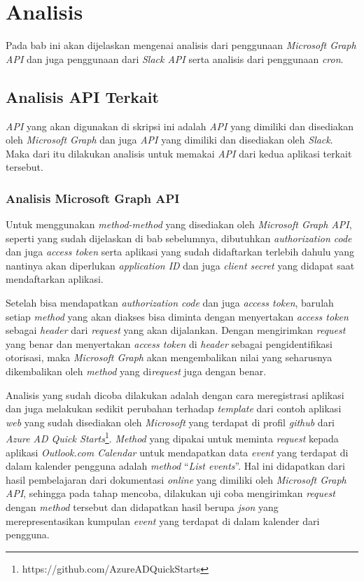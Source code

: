 \chapter{Analisis}
\label{chap:analisis}

Pada bab ini akan dijelaskan mengenai analisis dari penggunaan \textit{Microsoft Graph API} dan juga penggunaan dari \textit{Slack API} serta analisis dari penggunaan \textit{cron}. 

\section{Analisis API Terkait}
\label{sec:analisis_api_terkait}

\textit{API} yang akan digunakan di skripsi ini adalah \textit{API} yang dimiliki dan disediakan oleh \textit{Microsoft Graph} dan juga \textit{API} yang dimiliki dan disediakan oleh \textit{Slack}. Maka dari itu dilakukan analisis untuk memakai \textit{API} dari kedua aplikasi terkait tersebut. 

\subsection{Analisis Microsoft Graph API}
Untuk menggunakan \textit{method-method} yang disediakan oleh \textit{Microsoft Graph API}, seperti yang sudah dijelaskan di bab sebelumnya, dibutuhkan \textit{authorization code} dan juga \textit{access token} serta aplikasi yang sudah didaftarkan terlebih dahulu yang nantinya akan diperlukan \textit{application ID} dan juga \textit{client secret} yang didapat saat mendaftarkan aplikasi. 

Setelah bisa mendapatkan \textit{authorization code} dan juga \textit{access token}, barulah setiap \textit{method} yang akan diakses bisa diminta dengan menyertakan \textit{access token} sebagai \textit{header} dari \textit{request} yang akan dijalankan. Dengan mengirimkan \textit{request} yang benar dan menyertakan \textit{access token} di \textit{header} sebagai pengidentifikasi otorisasi, maka \textit{Microsoft Graph} akan mengembalikan nilai yang seharusnya dikembalikan oleh \textit{method} yang di\textit{request} juga dengan benar. 

Analisis yang sudah dicoba dilakukan adalah dengan cara meregistrasi aplikasi dan juga melakukan sedikit perubahan terhadap \textit{template} dari contoh aplikasi \textit{web} yang sudah disediakan oleh \textit{Microsoft} yang terdapat di profil \textit{github} dari \textit{Azure AD Quick Starts}\footnote{https://github.com/AzureADQuickStarts}. \textit{Method} yang dipakai untuk meminta \textit{request} kepada aplikasi \textit{Outlook.com Calendar} untuk mendapatkan data \textit{event} yang terdapat di dalam kalender pengguna adalah \textit{method} ``\textit{List events}''. Hal ini didapatkan dari hasil pembelajaran dari dokumentasi \textit{online} yang dimiliki oleh \textit{Microsoft Graph API}, sehingga pada tahap mencoba, dilakukan uji coba mengirimkan \textit{request} dengan \textit{method} tersebut dan didapatkan hasil berupa \textit{json} yang merepresentasikan kumpulan \textit{event} yang terdapat di dalam kalender dari pengguna.

